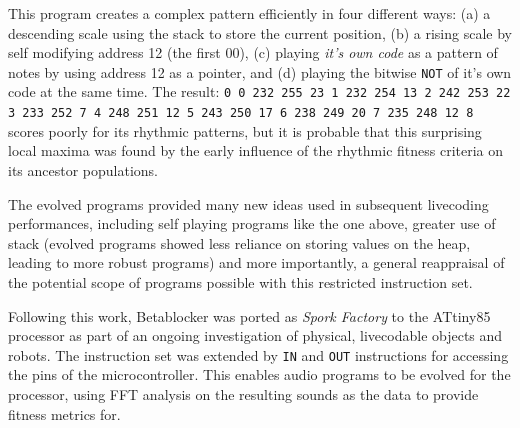 \documentclass[letterpaper, 12pt]{article}
\begin{document}
This program creates a complex pattern efficiently in four different ways:
 (a) a descending scale using the stack to store the current position,
 (b) a rising scale by self modifying address 12 (the first 00),
 (c) playing \emph{it's own code} as a pattern of notes by using address 12 as a pointer, and
 (d) playing the bitwise \texttt{NOT} of it's own code at the same time.
% 
% 
The result: \texttt{0 0 232 255 23 1 232 254 13 2 242 253 22 3 233 252 7 4 248 251 12 5 243 250 17 6 238 249 20 7 235 248 12 8} scores poorly for its rhythmic patterns, but it is probable that this surprising local maxima was found by the early influence of the rhythmic fitness criteria on its ancestor populations. 

The evolved programs provided many new ideas used in subsequent livecoding performances,  including self playing programs like the one above, greater use of stack (evolved programs showed less reliance on storing values on the heap, leading to more robust programs) and more importantly, a general reappraisal of the potential scope of programs possible with this restricted instruction set.

Following this work, Betablocker was ported as \emph{Spork Factory} to the ATtiny85 processor as part of an ongoing investigation of physical, livecodable objects and robots. 
The instruction set was extended by \texttt{IN} and \texttt{OUT} instructions for accessing the pins of the microcontroller. 
This enables audio programs to be evolved for the processor, using FFT analysis on the resulting sounds as the data to provide fitness metrics for.

\end{document}
